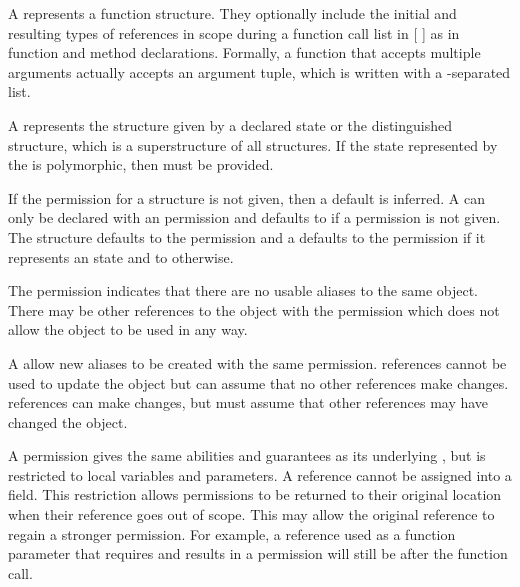 A  represents a function structure.  They optionally
include the initial and resulting types of references in scope during a
function call list in [ ] as in function and method declarations. 
Formally, a function that accepts multiple arguments actually accepts an
argument tuple, which is written with a \code{*}-separated list.

A  represents the structure 
given by a declared state
or the distinguished  structure, which is a superstructure
of all structures.  If the state represented by the 
is polymorphic, then  must be provided.

If the permission for a structure is not given, then a default is inferred.
A  can only be declared with 
an  permission and defaults to 
if a permission is not given.  The  structure 
defaults to the  permission and a  defaults 
to the  permission if it represents an 
 state and to  otherwise. 

The  permission indicates that there are no
usable aliases to the same object.  There may be other
references to the object with the  permission
which does not allow the object to be used in any way.

A  allow new aliases to be 
created with the same permission.
 references cannot be used to update the object
but can assume that no other references make changes. 
 references can make changes, but must assume that other
references may have changed the object.

A  permission gives the same abilities
and guarantees as its underlying , 
but is restricted to local variables and parameters.  
A  reference cannot be assigned into a field.
This restriction allows  permissions to be
returned to their original location when their reference goes out of 
scope.  This may allow the original reference to regain a stronger permission.
For example, a  reference used as a function parameter
that requires and results in a  permission will
still be  after the function call.

